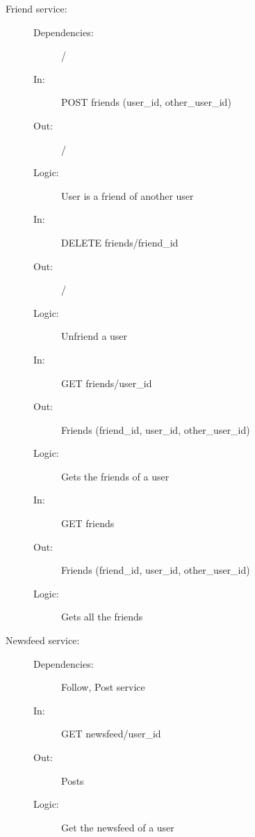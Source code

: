 \documentclass{article}
\begin{document}
\begin{description}
    \item [Friend service:]
    \begin{description}
        \item[]
        \item[Dependencies:] /
    \end{description}
    \begin{description}
        \item[]
        \item[In:] POST friends (user\_id, other\_user\_id)
        \item[Out:] /
        \item[Logic:] User is a friend of another user
        \item[]
    \end{description}
    \begin{description}
        \item[In:] DELETE friends/friend\_id
        \item[Out:] /
        \item[Logic:] Unfriend a user
        \item[]
    \end{description}
    \begin{description}
        \item[In:] GET friends/user\_id
        \item[Out:] Friends (friend\_id, user\_id, other\_user\_id)
        \item[Logic:] Gets the friends of a user
        \item[]
    \end{description}
    \begin{description}
        \item[In:] GET friends
        \item[Out:] Friends (friend\_id, user\_id, other\_user\_id)
        \item[Logic:] Gets all the friends
    \end{description}
\end{description}

\begin{description}
    \item [Newsfeed service:]
    \begin{description}
        \item[]
        \item[Dependencies:] Follow, Post service
    \end{description}
    \begin{description}
        \item[]
        \item[In:] GET newsfeed/user\_id
        \item[Out:] Posts
        \item[Logic:] Get the newsfeed of a user
    \end{description}
\end{description}
\end{document}
